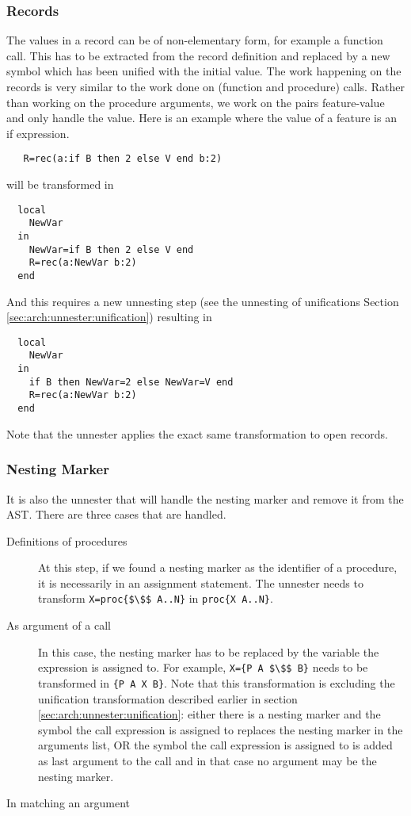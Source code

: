 \documentclass[a4paper]{memoir}
\begin{document}
\subsubsection{Records}\label{sec:arch:unnester:records}
The values in a record can be of non-elementary form, for example a function call. This has to be extracted from the record definition and replaced by a new symbol which has been unified with the initial value. The work happening on the records is very similar to the work done on (function and procedure) calls. Rather than working on the procedure arguments, we work on the pairs feature-value and only handle the value. 
Here is an example where the value of a feature is an if expression.
\begin{lstlisting}
   R=rec(a:if B then 2 else V end b:2)
\end{lstlisting}
will be transformed in
\begin{lstlisting}
  local
    NewVar
  in
    NewVar=if B then 2 else V end
    R=rec(a:NewVar b:2)
  end
\end{lstlisting}
And this requires a new unnesting step (see the unnesting of unifications Section \ref{sec:arch:unnester:unification}) resulting in 
\begin{lstlisting}
  local
    NewVar
  in
    if B then NewVar=2 else NewVar=V end
    R=rec(a:NewVar b:2)
  end
\end{lstlisting}

Note that the unnester applies the exact same transformation to open records.


\subsubsection{Nesting Marker}\label{sec:arch:unnester:nestingmarker}
It is also the unnester that will handle the nesting marker and remove it from the AST. There are three cases that are handled.
\begin{description}
  \item[Definitions of procedures] At this step, if we found a nesting marker as the identifier of a procedure, it is necessarily in an assignment statement. The unnester needs to transform \lstinline[mathescape]!X=proc{$\$$ A..N}! in \lstinline!proc{X A..N}!.
  \item[As argument of a call] In this case, the nesting marker has to be replaced by the variable the expression is assigned to. For example, \lstinline[mathescape]!X={P A $\$$ B}! needs to be transformed in  \lstinline!{P A X B}!. Note that this transformation is excluding the unification transformation described earlier in section \ref{sec:arch:unnester:unification}: either there is a nesting marker and the symbol the call expression is assigned to replaces the nesting marker in the arguments list, OR the symbol the call expression is assigned to is added as last argument to the call and in that case no argument may be the nesting marker.
  \item[In matching an argument] %
\end{description}
\end{document}
